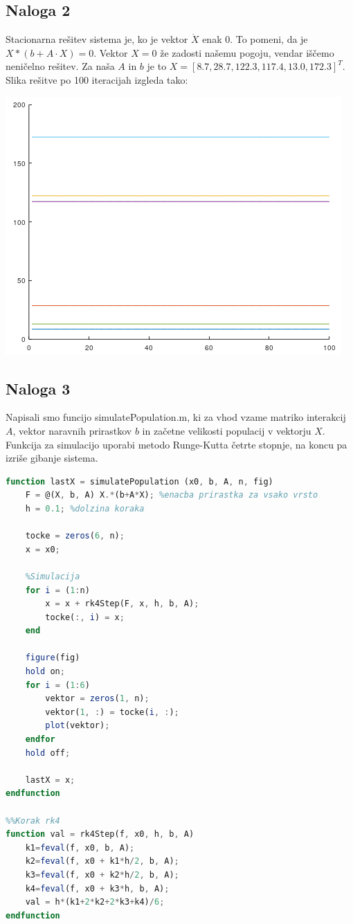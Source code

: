 \documentclass[a4paper, 12pt]{article}
\begin{document}
\subsection{Naloga 2}
Stacionarna rešitev sistema je, ko je vektor $ \dot X $ enak  $ 0 $. To pomeni, da je
$ X*(b+A\cdot X) = 0 $. Vektor $ X = 0 $ že zadosti našemu pogoju, vendar iščemo neničelno
rešitev. Za naša $ A $ in $ b $ je to $ X = \left[8.7, 28.7, 122.3, 117.4, 13.0, 172.3\right]^{T} $.
Slika rešitve po 100 iteracijah izgleda tako:\\
\begin{center}
	\includegraphics{stationary.png}
\end{center}

\subsection{Naloga 3}
Napisali smo funcijo {\sf simulatePopulation.m}, ki za vhod vzame matriko interakcij $ A $,
vektor naravnih prirastkov $ b $ in začetne velikosti populacij v vektorju $ X $. Funkcija za simulacijo
uporabi metodo Runge-Kutta četrte stopnje, na koncu pa izriše gibanje sistema.
\begin{lstlisting}[language=Octave]
function lastX = simulatePopulation (x0, b, A, n, fig)
    F = @(X, b, A) X.*(b+A*X); %enacba prirastka za vsako vrsto
    h = 0.1; %dolzina koraka

    tocke = zeros(6, n);
    x = x0;

    %Simulacija
    for i = (1:n)
        x = x + rk4Step(F, x, h, b, A);
        tocke(:, i) = x;
    end

    figure(fig)
    hold on;
    for i = (1:6)
        vektor = zeros(1, n);
        vektor(1, :) = tocke(i, :);
        plot(vektor);
    endfor
    hold off;

    lastX = x;
endfunction
  
%%Korak rk4
function val = rk4Step(f, x0, h, b, A)
    k1=feval(f, x0, b, A);
    k2=feval(f, x0 + k1*h/2, b, A);
    k3=feval(f, x0 + k2*h/2, b, A);
    k4=feval(f, x0 + k3*h, b, A);
    val = h*(k1+2*k2+2*k3+k4)/6;
endfunction
\end{lstlisting}
\end{document}
